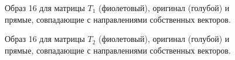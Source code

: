 \documentclass[a5paper, 10pt]{article}
\theoremstyle{definition}
\theoremstyle{plain}
\theoremstyle{remark}
\begin{document}
\begin{figure}[h]
\caption{Образ 16 для матрицы $T_1$ (фиолетовый), оригинал (голубой) и прямые, совпадающие с направлениями собственных векторов.}
\end{figure}


\newpage
\begin{figure}[h!]
\caption{Образ 16 для матрицы $T_2$ (фиолетовый), оригинал (голубой) и прямые, совпадающие с направлениями собственных векторов.}
\end{figure}
\end{document}
